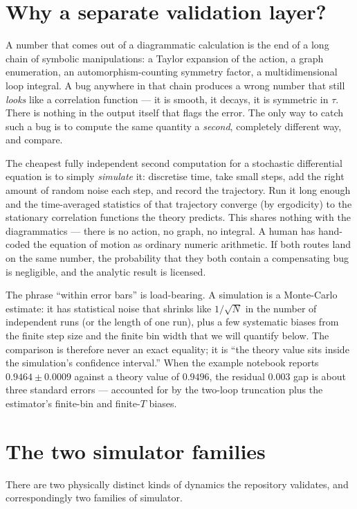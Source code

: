 \section{Why a separate validation layer?}

A number that comes out of a diagrammatic calculation is the end of a long chain
of symbolic manipulations: a Taylor expansion of the action, a graph enumeration,
an automorphism-counting symmetry factor, a multidimensional loop integral. A bug
anywhere in that chain produces a wrong number that still \emph{looks} like a
correlation function --- it is smooth, it decays, it is symmetric in $\tau$. There
is nothing in the output itself that flags the error. The only way to catch such
a bug is to compute the same quantity a \emph{second}, completely different way,
and compare.

The cheapest fully independent second computation for a stochastic differential
equation is to simply \emph{simulate} it: discretise time, take small steps,
add the right amount of random noise each step, and record the trajectory. Run it
long enough and the time-averaged statistics of that trajectory converge (by
ergodicity) to the stationary correlation functions the theory predicts. This
shares nothing with the diagrammatics --- there is no action, no graph, no
integral. A human has hand-coded the equation of motion as ordinary numeric
arithmetic. If both routes land on the same number, the probability that they
both contain a compensating bug is negligible, and the analytic result is
licensed.

The phrase ``within error bars'' is load-bearing. A simulation is a Monte-Carlo
estimate: it has statistical noise that shrinks like $1/\sqrt{N}$ in the number of
independent runs (or the length of one run), plus a few systematic biases from the
finite step size and the finite bin width that we will quantify below. The
comparison is therefore never an exact equality; it is ``the theory value sits
inside the simulation's confidence interval.'' When the example notebook reports
$0.9464 \pm 0.0009$ against a theory value of $0.9496$, the residual $0.003$ gap
is about three standard errors --- accounted for by the two-loop truncation plus
the estimator's finite-bin and finite-$T$ biases.

\section{The two simulator families}

There are two physically distinct kinds of dynamics the repository validates,
and correspondingly two families of simulator.

